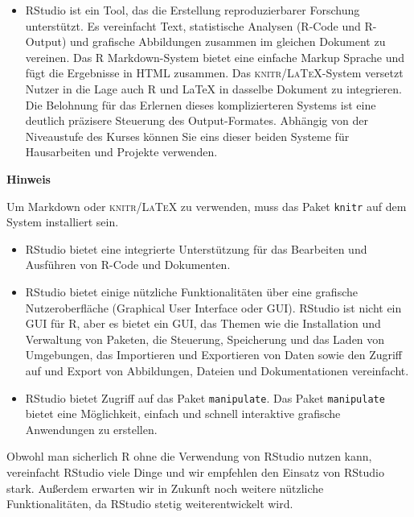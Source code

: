 \documentclass[
  ngerman,
]{scrbook}
\providecommand{\tightlist}{%
  \setlength{\itemsep}{0pt}\setlength{\parskip}{0pt}}
\newenvironment{hinweis}[1]
  {
  \begin{itemize}
  \renewcommand{\labelitemi}{
    \raisebox{1.8\height}[0pt][0pt]{
      {\setkeys{Gin}{width=7em,keepaspectratio}
        {\Large \textcolor{dark-fom-green}\faHandORight}}
        }
  }
  \begin{blackbox}
        \bgroup\color{dark-fom-green}
          {\textbf{Hinweis}}
        \egroup
  \item
  }
  {
  \end{blackbox}
  \end{itemize}
  }
\begin{document}
\begin{itemize}
\tightlist
\item
  \textsf{RStudio} ist ein Tool, das die Erstellung reproduzierbarer Forschung unterstützt. Es vereinfacht Text, statistische Analysen (\textsf{R}-Code und \textsf{R}-Output) und grafische Abbildungen zusammen im gleichen Dokument zu vereinen. Das \textsf{R Markdown}-System bietet eine einfache Markup Sprache und fügt die Ergebnisse in HTML zusammen. Das \textsc{knitr/LaTeX}-System versetzt Nutzer in die Lage auch \textsf{R} und \textsf{LaTeX} in dasselbe Dokument zu integrieren. Die Belohnung für das Erlernen dieses komplizierteren Systems ist eine deutlich präzisere Steuerung des Output-Formates. Abhängig von der Niveaustufe des Kurses können Sie eins dieser beiden Systeme für Hausarbeiten und Projekte verwenden.
\end{itemize}

\begin{hinweis}{hinweis}
Um Markdown oder \textsc{knitr/LaTeX} zu verwenden, muss das Paket \texttt{knitr} auf dem System installiert sein.

\end{hinweis}

\begin{itemize}
\tightlist
\item
  \textsf{RStudio} bietet eine integrierte Unterstützung für das Bearbeiten und Ausführen von \textsf{R}-Code und Dokumenten.
\item
  \textsf{RStudio} bietet einige nützliche Funktionalitäten über eine grafische Nutzeroberfläche (Graphical User Interface oder GUI). \textsf{RStudio} ist nicht ein GUI für \textsf{R}, aber es bietet ein GUI, das Themen wie die Installation und Verwaltung von Paketen, die Steuerung, Speicherung und das Laden von Umgebungen, das Importieren und Exportieren von Daten sowie den Zugriff auf und Export von Abbildungen, Dateien und Dokumentationen vereinfacht.
\item
  \textsf{RStudio} bietet Zugriff auf das Paket \texttt{manipulate}. Das Paket \texttt{manipulate} bietet eine Möglichkeit, einfach und schnell interaktive grafische Anwendungen zu erstellen.
\end{itemize}

Obwohl man sicherlich \textsf{R} ohne die Verwendung von \textsf{RStudio} nutzen kann, vereinfacht \textsf{RStudio} viele Dinge und wir empfehlen den Einsatz von \textsf{RStudio} stark. Außerdem erwarten wir in Zukunft noch weitere nützliche Funktionalitäten, da \textsf{RStudio} stetig weiterentwickelt wird.
\end{document}
